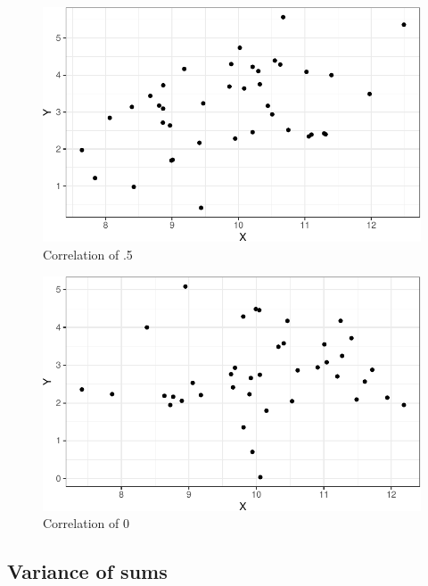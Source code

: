 \documentclass[
  letterpaper,
  DIV=11,
  numbers=noendperiod]{scrreprt}
\begin{document}
\begin{figure}[H]

{\centering \includegraphics{15-Multivariate-Expectation_files/figure-pdf/cor3-fig-1.pdf}

}

\caption{Correlation of .5}

\end{figure}%

\begin{figure}[H]

{\centering \includegraphics{15-Multivariate-Expectation_files/figure-pdf/cor4-fig-1.pdf}

}

\caption{Correlation of 0}

\end{figure}%

\newpage

\subsection{Variance of sums}\label{variance-of-sums}
\end{document}
